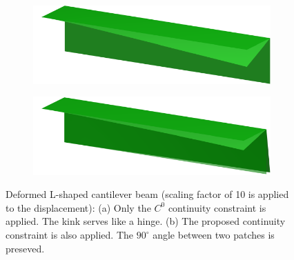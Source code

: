 \documentclass[preprint,12pt]{elsarticle}
\theoremstyle{remark}
\begin{document}
\begin{figure}[!hbt]
    \centering
    \captionsetup[subfigure]{font = footnotesize}
    \begin{subfigure}[b]{.49\textwidth}
        \centering
        \includegraphics[width = \textwidth]{L-beam-c0_result}
        \caption{}\label{fig:L-beam-deform-c0}
    \end{subfigure}
    \begin{subfigure}[b]{.49\textwidth}
        \centering
        \includegraphics[width = \textwidth]{L-beam-c1_result}
        \caption{}\label{fig:L-beam-deform-c1}
    \end{subfigure}
	\caption{Deformed L-shaped cantilever beam (scaling factor of 10 is applied to the displacement): (a) Only the $C^0$ continuity constraint is applied. The kink serves like a hinge. (b) The proposed continuity constraint is also applied. The $90^\circ$ angle between two patches is preseved.}\label{fig:L-beam-deform}
\end{figure}

\clearpage


\end{document}
